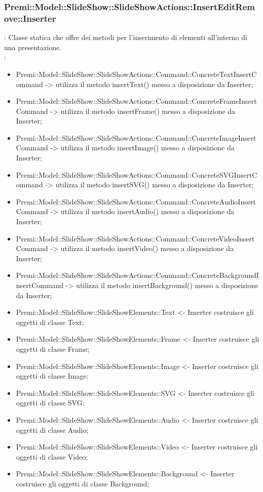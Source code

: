 {	\subsubsection{Premi::Model::SlideShow::SlideShowActions::InsertEditRemove::Inserter}{
		\textbf{\tipo}: Classe statica che offre dei metodi per l’inserimento di elementi all’interno di una presentazione.\\	
		\textbf{\relaz}:
		\begin{itemize}
			\item Premi::Model::SlideShow::SlideShowActions::Command::ConcreteTextInsertCommand -> utilizza il metodo insertText() messo a disposizione da Inserter;
			\item Premi::Model::SlideShow::SlideShowActions::Command::ConcreteFrameInsertCommand -> utilizza il metodo insertFrame() messo a disposizione da Inserter;
			\item Premi::Model::SlideShow::SlideShowActions::Command::ConcreteImageInsertCommand -> utilizza il metodo insertImage() messo a disposizione da Inserter;
			\item Premi::Model::SlideShow::SlideShowActions::Command::ConcreteSVGInsertCommand -> utilizza il metodo insertSVG() messo a disposizione da Inserter;
			\item Premi::Model::SlideShow::SlideShowActions::Command::ConcreteAudioInsertCommand -> utilizza il metodo insertAudio() messo a disposizione da Inserter;
			\item Premi::Model::SlideShow::SlideShowActions::Command::ConcreteVideoInsertCommand -> utilizza il metodo insertVideo() messo a disposizione da Inserter;
			\item Premi::Model::SlideShow::SlideShowActions::Command::ConcreteBackgroundInsertCommand -> utilizza il metodo insertBackground() messo a disposizione da Inserter;
            \item Premi::Model::SlideShow::SlideShowElements::Text <- Inserter costruisce gli oggetti di classe Text;
            \item Premi::Model::SlideShow::SlideShowElements::Frame <- Inserter costruisce gli oggetti di classe Frame;
            \item Premi::Model::SlideShow::SlideShowElements::Image <- Inserter costruisce gli oggetti di classe Image;
            \item Premi::Model::SlideShow::SlideShowElements::SVG <- Inserter costruisce gli oggetti di classe SVG;
            \item Premi::Model::SlideShow::SlideShowElements::Audio <- Inserter costruisce gli oggetti di classe Audio;
            \item Premi::Model::SlideShow::SlideShowElements::Video <- Inserter costruisce gli oggetti di classe Video;
            \item Premi::Model::SlideShow::SlideShowElements::Background <- Inserter costruisce gli oggetti di classe Background;
		\end{itemize} 
	}
}
